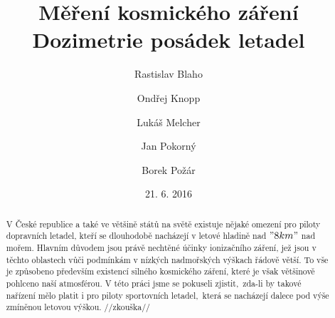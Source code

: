 \documentclass[11pt,a4paper]{article}
\begin{document}
\title{Měření kosmického záření\\Dozimetrie posádek letadel}
\author[1]{Rastislav Blaho}
\author[2]{Ondřej Knopp}
\author[3]{Lukáš Melcher}
\author[4]{Jan Pokorný}
\author[5]{Borek Požár}

\date{21. 6. 2016}

\maketitle

\thispagestyle{empty}

\begin{abstract}
V České republice a také ve většině států na světě existuje nějaké omezení pro
piloty dopravních letadel, kteří se dlouhodobě nacházejí v letové hladině nad
$"8 km"$ nad mořem. Hlavním důvodem jsou právě nechtěné účinky ionizačního
záření, jež jsou v těchto oblastech vůči podmínkám v nízkých nadmořských výškach
řádově větší. To vše je způsobeno především existencí silného kosmického
záření, které je však většinově pohlceno naší atmosférou. V této práci jsme se
pokuseli zjistit,~zda-li by takové nařízení mělo platit i pro piloty sportovních
letadel,~která se nacházejí dalece pod výše zmíněnou letovou výškou.
//zkouška//
%

\end{abstract}
\end{document}
